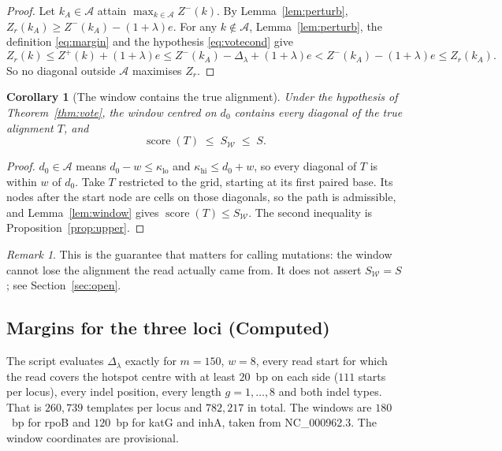 \documentclass[11pt]{article}
\theoremstyle{plain}
\newtheorem{corollary}[theorem]{Corollary}
\theoremstyle{definition}
\theoremstyle{remark}
\newtheorem*{remark}{Remark}
\DeclareMathOperator{\score}{score}
\newcommand{\W}{\mathcal{W}}
\newcommand{\A}{\mathcal{A}}
\newcommand{\kaplo}{\kappa_{\mathrm{lo}}}
\newcommand{\kaphi}{\kappa_{\mathrm{hi}}}
\newcommand{\code}[1]{\texttt{\detokenize{#1}}}
\begin{document}
\begin{proof}
Let $k_A \in \A$ attain $\max_{k \in \A} Z^{-}(k)$. By Lemma~\ref{lem:perturb},
$Z_r(k_A) \ge Z^{-}(k_A) - (1+\lambda)e$. For any $k \notin \A$,
Lemma~\ref{lem:perturb}, the definition \eqref{eq:margin} and the hypothesis
\eqref{eq:votecond} give
\[
Z_r(k) \le Z^{+}(k) + (1+\lambda)e
       \le Z^{-}(k_A) - \Delta_\lambda + (1+\lambda)e
       <   Z^{-}(k_A) - (1+\lambda)e
       \le Z_r(k_A).
\]
So no diagonal outside $\A$ maximises $Z_r$.
\end{proof}

\begin{corollary}[The window contains the true alignment]\label{cor:contain}
Under the hypothesis of Theorem~\ref{thm:vote}, the window centred on $d_0$
contains every diagonal of the true alignment $T$, and
\[
\score(T) \;\le\; S_{\W} \;\le\; S .
\]
\end{corollary}

\begin{proof}
$d_0 \in \A$ means $d_0 - w \le \kaplo$ and $\kaphi \le d_0 + w$, so every
diagonal of $T$ is within $w$ of $d_0$. Take $T$ restricted to the grid,
starting at its first paired base. Its nodes after the start node are cells on
those diagonals, so the path is admissible, and Lemma~\ref{lem:window} gives
$\score(T) \le S_{\W}$. The second inequality is Proposition~\ref{prop:upper}.
\end{proof}

\begin{remark}
This is the guarantee that matters for calling mutations: the window cannot lose
the alignment the read actually came from. It does not assert $S_{\W} = S$; see
Section~\ref{sec:open}.
\end{remark}

\subsection{Margins for the three loci (Computed)}\label{sec:margins}

The script \code{reference/vote_margin.py} evaluates $\Delta_\lambda$ exactly
for $m = 150$, $w = 8$, every read start for which the read covers the hotspot
centre with at least $20$~bp on each side ($111$ starts per locus), every indel
position, every length $g = 1,\dots,8$ and both indel types. That is $260{,}739$
templates per locus and $782{,}217$ in total. The windows are $180$~bp for rpoB
and $120$~bp for katG and inhA, taken from NC\_000962.3. The window coordinates
are provisional.
\end{document}
